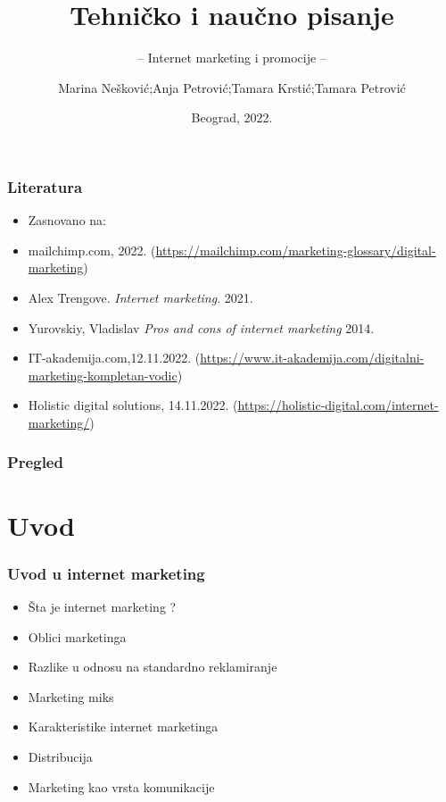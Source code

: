 \documentclass{beamer}
\title{Tehničko i naučno pisanje}
\subtitle{-- Internet marketing i promocije --}
\author{Marina Nešković;Anja Petrović;Tamara Krstić;Tamara Petrović}
\institute{Matematički fakultet\\Univerzitet u Beogradu}
\date{
	\footnotesize{Beograd, 2022.}	
}
\begin{document}
\begin{frame}
	\thispagestyle{empty}
	\titlepage
\end{frame}

\addtocounter{framenumber}{-1}

\begin{frame}[fragile]\frametitle{Literatura}
	\begin{itemize}
		\item Zasnovano na:\\
	\item mailchimp.com, 2022.
	(\url{https://mailchimp.com/marketing-glossary/digital-marketing})
        \item  Alex Trengove. \emph{Internet marketing}. 2021.
        \item Yurovskiy, Vladislav \emph{Pros and cons of internet marketing} 2014.
        \item IT-akademija.com,12.11.2022.
        (\url{https://www.it-akademija.com/digitalni-marketing-kompletan-vodic})
        \item Holistic digital solutions, 14.11.2022.
        (\url{https://holistic-digital.com/internet-marketing/})
	\end{itemize}
\end{frame}

\begin{frame}
	\frametitle{Pregled} %
	\tableofcontents[hidesubsections] 
\end{frame}
\section{Uvod}

\begin{frame}[fragile]\frametitle{Uvod u internet marketing}
	\begin{itemize}	
		\item  Šta je internet marketing ?
		\item  Oblici marketinga
		\item  Razlike u odnosu na standardno reklamiranje 
		\item  Marketing miks
		\item  Karakteristike internet marketinga
		\item  Distribucija
		\item  Marketing kao vrsta komunikacije 
	\end{itemize}
\end{frame}
\end{document}
